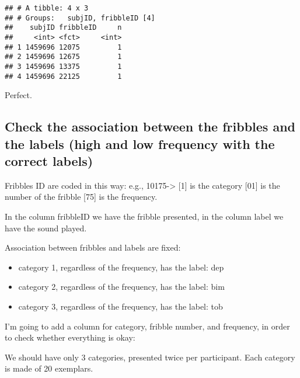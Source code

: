 \documentclass[
]{article}
\begin{document}
\begin{verbatim}
## # A tibble: 4 x 3
## # Groups:   subjID, fribbleID [4]
##    subjID fribbleID     n
##     <int> <fct>     <int>
## 1 1459696 12075         1
## 2 1459696 12675         1
## 3 1459696 13375         1
## 4 1459696 22125         1
\end{verbatim}

Perfect.

\hypertarget{check-the-association-between-the-fribbles-and-the-labels-high-and-low-frequency-with-the-correct-labels}{%
\subsection{Check the association between the fribbles and the labels
(high and low frequency with the correct
labels)}\label{check-the-association-between-the-fribbles-and-the-labels-high-and-low-frequency-with-the-correct-labels}}

Fribbles ID are coded in this way: e.g., 10175-\textgreater{} {[}1{]} is
the category {[}01{]} is the number of the fribble {[}75{]} is the
frequency.

In the column fribbleID we have the fribble presented, in the column
label we have the sound played.

Association between fribbles and labels are fixed:

\begin{itemize}
\item
  category 1, regardless of the frequency, has the label: dep
\item
  category 2, regardless of the frequency, has the label: bim
\item
  category 3, regardless of the frequency, has the label: tob
\end{itemize}

I'm going to add a column for category, fribble number, and frequency,
in order to check whether everything is okay:

We should have only 3 categories, presented twice per participant. Each
category is made of 20 exemplars.
\end{document}
